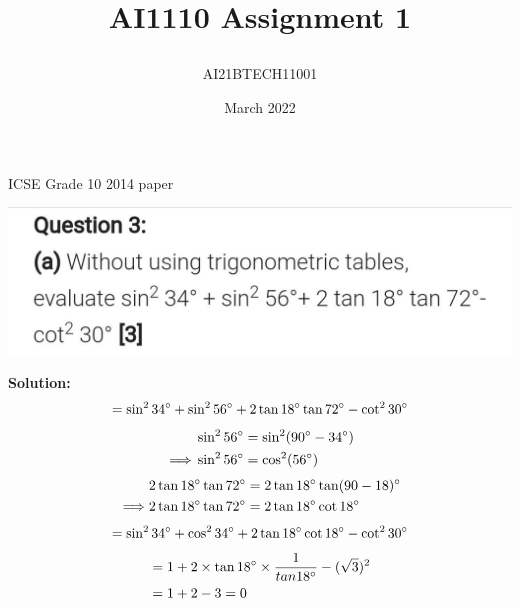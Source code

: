 \documentclass[journal,12pt,twocolumn]{IEEEtran}
\title{\textbf{AI1110 Assignment 1}
\author{AI21BTECH11001 }}
\date{March 2022}
\begin{document}
\maketitle
\begin{center}
{ICSE Grade 10 2014 paper}\end{center}

\includegraphics[scale=0.22]{main.jpeg}

\textbf{Solution:}
\begin{align}
= \sin^2 34\degree+ \sin^2 56\degree+2\tan 18\degree \tan 72\degree - \cot^2 30\degree
\end{align}
\begin{align}
 &\sin^2 56\degree = \sin^2 (90\degree - 34\degree)\\
  \implies&\sin^2 56\degree =\cos^2 (56\degree)
  \end{align}
  \begin{align}
  &2\tan18\degree\tan72\degree = 2\tan18\degree\tan(90 - 18)\degree\\
  \implies &2\tan18\degree\tan72\degree = 2\tan18\degree\cot18\degree
 \end{align}
 \begin{align}
= \sin^2 34\degree +\cos^2 34\degree +2\tan18\degree \cot18\degree -\cot^2 30\degree
\end{align}
 \begin{align}
&= 1 + 2\times \tan18\degree \times\frac{1}{tan18\degree} - (\sqrt{3})^2\\
&= 1 + 2 - 3
 = 0\end{align}
\end{document}
